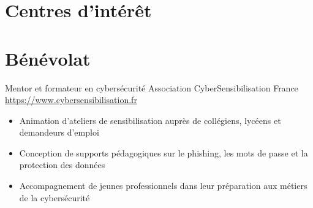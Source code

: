 \documentclass[a4paper, serif, 10pt]{moderncv}
\begin{document}
\section{Centres d'intérêt}

\section{Bénévolat}

        {Mentor et formateur en cybersécurité}
        {Association CyberSensibilisation France}
        {\url{https://www.cybersensibilisation.fr}}
        {}
        {\begin{itemize}
\item Animation d'ateliers de sensibilisation auprès de collégiens, lycéens et demandeurs d'emploi
\item Conception de supports pédagogiques sur le phishing, les mots de passe et la protection des données
\item Accompagnement de jeunes professionnels dans leur préparation aux métiers de la cybersécurité
\end{itemize}}
    
\end{document}
